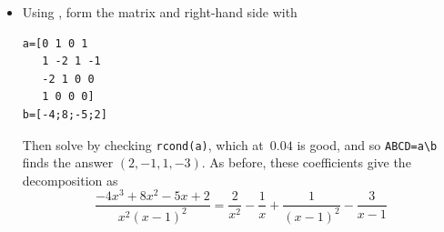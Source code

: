 \begin{OmitV1}
\begin{example}
\begin{solution}
\begin{itemize}
\item Using \script, form the matrix and right-hand side with
\begin{verbatim}
a=[0 1 0 1
   1 -2 1 -1
   -2 1 0 0
   1 0 0 0]
b=[-4;8;-5;2]
\end{verbatim}
\setbox\ajrqrbox\hbox{}%
\marginajrbox%
Then solve by checking \verb|rcond(a)|, which at~\(0.04\) is good, and so \verb|ABCD=a\b| finds the answer \((2,-1,1,-3)\).
As before, these coefficients give the decomposition as
\begin{equation*}
\frac{-4x^3+8x^2-5x+2}{x^2(x-1)^2}
=\frac 2{x^2}-\frac 1{x}+ \frac 1{(x-1)^2} -\frac 3{x-1}
\end{equation*}

\end{itemize}
\end{solution}
\end{example}
\end{OmitV1}



